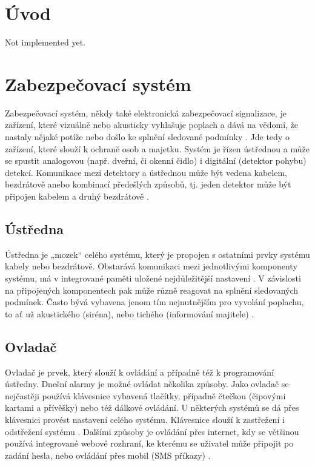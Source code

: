 \documentclass[FM,DP]{tulthesis}  %
\begin{document}

\chapter{Úvod}
Not implemented yet.

\chapter{Zabezpečovací systém}
Zabezpečovací systém, někdy také elektronická zabezpečovací signalizace, je zařízení, které vizuálně nebo akusticky vyhlašuje poplach a dává na vědomí, že nastaly nějaké potíže nebo došlo ke splnění sledované podmínky \cite{Security alarm}. Jde tedy o zařízení, které slouží k ochraně osob a majetku. Systém je řízen ústřednou a může se spustit analogovou (např. dveřní, či okenní čidlo) i digitální (detektor pohybu) detekcí. Komunikace mezi detektory a ústřednou může být vedena kabelem, bezdrátově anebo kombinací předešlých způsobů, tj. jeden detektor může být připojen kabelem a druhý bezdrátově \cite{Electronic security system}.

\section{Ústředna}
Ústředna je „mozek“ celého systému, který je propojen s ostatními prvky systému kabely nebo bezdrátově. Obstarává komunikaci mezi jednotlivými komponenty systému, má v integrované paměti uložené nejdůležitější nastavení \cite{Electronic security system}. V závislosti na připojených komponentech pak může různě reagovat na splnění sledovaných podmínek. Často bývá vybavena jenom tím nejnutnějším pro vyvolání poplachu, to ať už akustického (siréna), nebo tichého (informování majitele) \cite{Security alarm}.

\section{Ovladač}
Ovladač je prvek, který slouží k ovládání a případně též k programování ústředny. Dnešní alarmy je možné ovládat několika způsoby. Jako ovladač se nejčastěji používá klávesnice vybavená tlačítky, případně čtečkou (čipovými kartami a přívěšky) nebo též dálkové ovládání. U některých systémů se dá přes klávesnici provést nastavení celého systému. Klávesnice slouží k zastřežení i odstřežení systému \cite{Electronic security signalisation}. Dalšími způsoby je ovládání přes internet, kdy se většinou používá integrované webové rozhraní, ke kterému se uživatel může připojit po zadání hesla, nebo ovládání přes mobil (SMS příkazy) \cite{Bachelor thesis}.
\end{document}
